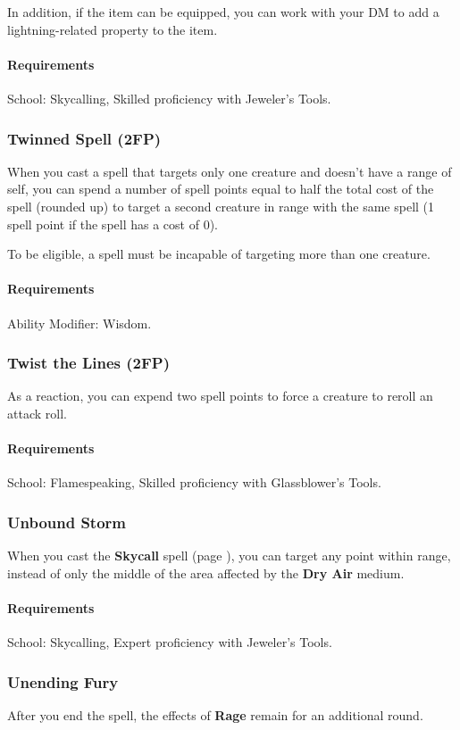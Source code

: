    In addition, if the item can be equipped, you can work with your DM to add a lightning-related property to the item.
    \paragraph{Requirements} School: Skycalling, Skilled proficiency with Jeweler's Tools.
\subsubsection{Twinned Spell (2FP)} \label{feat::twinnedspell}
    When you cast a spell that targets only one creature and doesn't have a range of self, you can spend a number of spell points equal to half the total cost of the spell (rounded up) to target a second creature in range with the same spell (1 spell point if the spell has a cost of 0).

    To be eligible, a spell must be incapable of targeting more than one creature.
    \paragraph{Requirements} Ability Modifier: Wisdom.
\subsubsection{Twist the Lines (2FP)} \label{feat::twistthelines}
    As a reaction, you can expend two spell points to force a creature to reroll an attack roll.
    \paragraph{Requirements} School: Flamespeaking, Skilled proficiency with Glassblower's Tools.
\subsubsection{Unbound Storm} \label{feat::unboundstorm}
    When you cast the \textbf{Skycall} spell (page \pageref{spell::skycall}), you can target any point within range, instead of only the middle of the area affected by the \textbf{Dry Air} medium.
    \paragraph{Requirements} School: Skycalling, Expert proficiency with Jeweler's Tools.
\subsubsection{Unending Fury} \label{feat::unendingfury}
    After you end the spell, the effects of \textbf{Rage} remain for an additional round.
